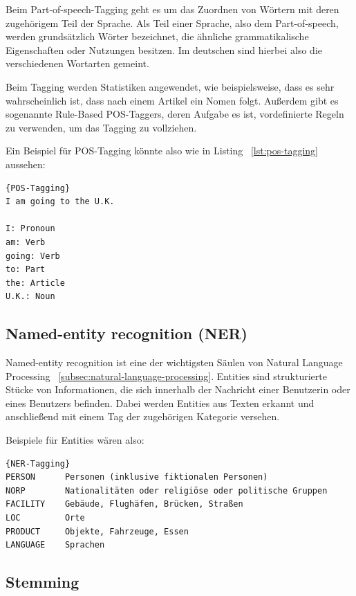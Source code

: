Beim Part-of-speech-Tagging geht es um das Zuordnen von Wörtern mit deren zugehörigem Teil der Sprache.
Als Teil einer Sprache, also dem Part-of-speech, werden grundsätzlich Wörter bezeichnet, die ähnliche grammatikalische Eigenschaften oder Nutzungen besitzen.
Im deutschen sind hierbei also die verschiedenen Wortarten gemeint.

Beim Tagging werden Statistiken angewendet, wie beispielsweise, dass es sehr wahrscheinlich ist, dass nach einem Artikel ein Nomen folgt.
Außerdem gibt es sogenannte Rule-Based POS-Taggers, deren Aufgabe es ist, vordefinierte Regeln zu verwenden, um das Tagging zu vollziehen.\cite{machineLearningTextAnalysis, naturalLanguageProcessing}

Ein Beispiel für POS-Tagging könnte also wie in Listing ~\ref{lst:pos-tagging} aussehen:

\begin{lstlisting}[label={lst:pos-tagging},caption={Beispiel für POS-Tagging}]{POS-Tagging}
I am going to the U.K.

I: Pronoun
am: Verb
going: Verb
to: Part
the: Article
U.K.: Noun
\end{lstlisting}

\subsection{Named-entity recognition (NER)}

Named-entity recognition ist eine der wichtigsten Säulen von Natural Language Processing ~\ref{subsec:natural-language-processing}.
Entities sind strukturierte Stücke von Informationen, die sich innerhalb der Nachricht einer Benutzerin oder eines Benutzers befinden.
Dabei werden Entities aus Texten erkannt und anschließend mit einem Tag der zugehörigen Kategorie versehen.\cite{namedEntityRecognition}

Beispiele für Entities wären also:

\begin{lstlisting}[label={lst:ner-tagging},caption={Beispiele für Enitites}]{NER-Tagging}
PERSON      Personen (inklusive fiktionalen Personen)
NORP        Nationalitäten oder religiöse oder politische Gruppen
FACILITY    Gebäude, Flughäfen, Brücken, Straßen
LOC         Orte
PRODUCT     Objekte, Fahrzeuge, Essen
LANGUAGE    Sprachen
\end{lstlisting}

\subsection{Stemming}\label{subsec:stemming}

